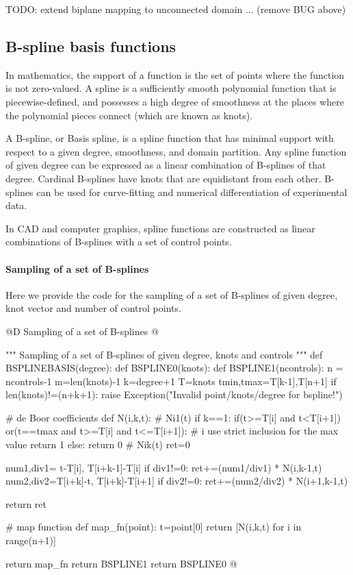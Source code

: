 \documentclass[11pt,oneside]{article}	%
\begin{document}
TODO: extend biplane mapping to unconnected domain ... (remove BUG above)



\subsection{B-spline basis functions}

In mathematics, the support of a function is the set of points where the function is not zero-valued.
A spline is a sufficiently smooth polynomial function that is piecewise-defined, and possesses a high degree of smoothness at the places where the polynomial pieces connect (which are known as knots).

A B-spline, or Basis spline, is a spline function that has minimal support with respect to a given degree, smoothness, and domain partition. Any spline function of given degree can be expressed as a linear combination of B-splines of that degree. Cardinal B-splines have knots that are equidistant from each other. B-splines can be used for curve-fitting and numerical differentiation of experimental data.

In CAD and computer graphics, spline functions are constructed as linear combinations of B-splines with a set of control points.

\paragraph{Sampling of a set of B-splines}
Here we provide the code  for  the sampling of a set of B-splines of given degree, knot vector and number of control points.

@D Sampling of a set of B-splines
@{""" Sampling of a set of B-splines of given degree, knots and controls """
def BSPLINEBASIS(degree):
	def BSPLINE0(knots):
		def BSPLINE1(ncontrols):
			n = ncontrols-1
			m=len(knots)-1
			k=degree+1
			T=knots
			tmin,tmax=T[k-1],T[n+1]			
			if len(knots)!=(n+k+1):
				raise Exception("Invalid point/knots/degree for bspline!")			

			# de Boor coefficients
			def N(i,k,t):				
				# Ni1(t)
				if k==1:
					if(t>=T[i] and t<T[i+1]) or(t==tmax and t>=T[i] and t<=T[i+1]):
						# i use strict inclusion for the max value
						return 1
					else:
						return 0				
				# Nik(t)
				ret=0
				
				num1,div1= t-T[i], T[i+k-1]-T[i]
				if div1!=0: ret+=(num1/div1) * N(i,k-1,t)				
				num2,div2=T[i+k]-t, T[i+k]-T[i+1]
				if div2!=0:  ret+=(num2/div2) * N(i+1,k-1,t)
				
				return ret
			
			# map function
			def map_fn(point):
				t=point[0]
				return [N(i,k,t) for i in range(n+1)]
							
			return map_fn
		return BSPLINE1
	return BSPLINE0
@}
\end{document}
